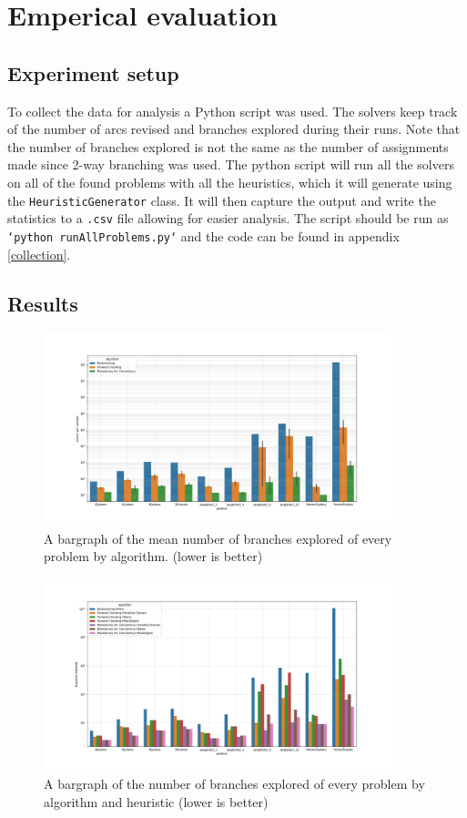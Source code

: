 \documentclass[british]{article}
\newcommand{\code}[1]{\texttt{#1}}
\begin{document}
	
	\section{Emperical evaluation}
	\subsection{Experiment setup}
	To collect the data for analysis a Python script was used. The solvers keep track of the number of arcs revised and branches explored during their runs. Note that the number of branches explored is not the same as the number of assignments made since 2-way branching was used. The python script will run all the solvers on all of the found problems with all the heuristics, which it will generate using the \code{HeuristicGenerator} class. It will then capture the output and write the statistics to a \code{.csv} file allowing for easier analysis. The script should be run as \code{`python runAllProblems.py`} and the code can be found in appendix \ref{collection}.
	
	\subsection{Results}
	
	\begin{figure}[!ht]
		\centering
		\includegraphics[width=0.9\textwidth]{meanBranchPerAlgo}
		\caption{A bargraph of the mean number of branches explored of every problem by algorithm. (lower is better)}
		\label{byAlgo}
	\end{figure}
	
	\begin{figure}[!ht]
		\centering
		\includegraphics[width=0.9\textwidth]{branchPerAlgoAndHeuristic}
		\caption{A bargraph of the number of branches explored of every problem by algorithm and heuristic (lower is better)}
		\label{byHeuristic}
	\end{figure}
	
\end{document}
